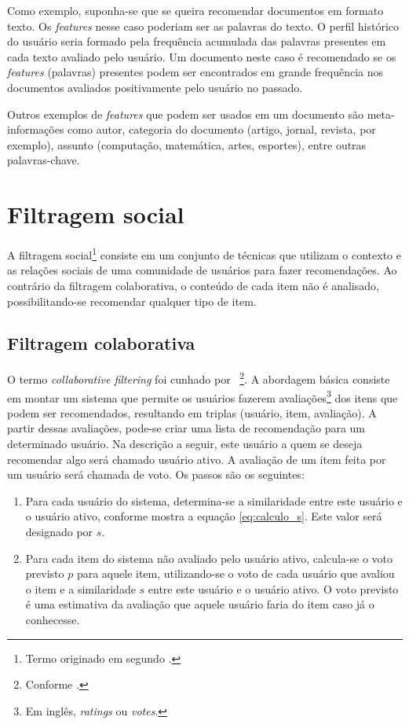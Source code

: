 Como exemplo, suponha-se que se queira recomendar documentos em formato texto. Os \textit{features} nesse caso poderiam ser as palavras do texto. O perfil histórico do usuário seria formado pela frequência acumulada das palavras presentes em cada texto avaliado pelo usuário. Um documento neste caso é recomendado se os \textit{features} (palavras) presentes podem ser encontrados em grande frequência nos documentos avaliados positivamente pelo usuário no passado.

Outros exemplos de \textit{features} que podem ser usados em um documento são meta-informações como autor, categoria do documento (artigo, jornal, revista, por exemplo), assunto (computação, matemática, artes, esportes), entre outras palavras-chave.


\section{Filtragem social} %


A filtragem social\footnote{Termo originado em \cite{Malone87} segundo \cite{Hill95}.} consiste em um conjunto de técnicas que utilizam o contexto e as relações sociais de uma comunidade de usuários para fazer recomendações. Ao contrário da filtragem colaborativa, o conteúdo de cada item não é analisado, possibilitando-se recomendar qualquer tipo de item.

\subsection{Filtragem colaborativa}

O termo \textit{collaborative filtering} foi cunhado por \cite{Goldberg92}~\footnote{Conforme \cite{Resnick97}.}. A abordagem básica consiste em montar um sistema que permite os usuários fazerem avaliações\footnote{Em inglês, \textit{ratings} ou \textit{votes}.} dos itens que podem ser recomendados, resultando em triplas (usuário, item, avaliação). A partir dessas avaliações, pode-se criar uma lista de recomendação para um determinado usuário. Na descrição a seguir, este usuário a quem se deseja recomendar algo será chamado usuário ativo. A avaliação de um item feita por um usuário será chamada de voto. Os passos são os seguintes:

\begin{enumerate}
\item 
Para cada usuário do sistema, determina-se a similaridade entre este usuário e o usuário ativo, conforme mostra a equação \ref{eq:calculo_s}. Este valor será designado por $s$.

\item Para cada item do sistema não avaliado pelo usuário ativo, calcula-se o voto previsto $p$ para aquele item, utilizando-se o voto de cada usuário que avaliou o item e a similaridade $s$ entre este usuário e o usuário ativo. O voto previsto é uma estimativa da avaliação que aquele usuário faria do item caso já o conhecesse.
\end{enumerate}

